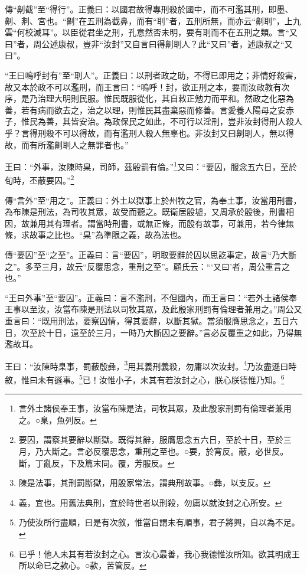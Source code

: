 {\noindent\zhuan{}\fzbyks 傳“劓截”至“得行”。正義曰：以國君故得專刑殺於國中，而不可濫其刑，即墨、劓、剕、宮也。“劓”在五刑為截鼻，而有“刵”者，五刑所無，而亦云“劓刵”，上九雲“何校滅耳”。以臣從君坐之刑，孔意然否未明，要有刵而不在五刑之類。言“又曰”者，周公述康叔，豈非“汝封”又自言曰得劓刵人？此“又曰”者，述康叔之“又曰”。 \par}

{\noindent\shu{}\fzkt “王曰嗚呼封有”至“刵人”。正義曰：以刑者政之助，不得已即用之；非情好殺害，故又本於政不可以濫刑，而王言曰：“嗚呼！封，欲正刑之本，要而汝政教有次序，是乃治理大明則民服。惟民既服從化，其自敕正勉力而平和。然政之化惡為善，若有病而欲去之，治之以理，則惟民其盡棄惡而修善。言愛養人陽母之安赤子，惟民為善，其皆安治。為政保民之如此，不可行以淫刑，豈非汝封得刑人殺人乎？言得刑殺不可以得故，而有濫刑人殺人無辜也。非汝封又曰劓刵人，無以得故，而有所濫劓刵人之無罪者也。” \par}

王曰：“外事，汝陳時臬，司師，茲殷罰有倫。”\footnote{言外土諸侯奉王事，汝當布陳是法，司牧其眾，及此殷家刑罰有倫理者兼用之。○臬，魚列反。}又曰：“要囚，服念五六日，至於旬時，丕蔽要囚。”\footnote{要囚，謂察其要辭以斷獄。既得其辭，服膺思念五六日，至於十日，至於三月，乃大斷之。言必反覆思念，重刑之至也。○要，於宵反。蔽，必世反。斷，丁亂反，下及篇末同。覆，芳服反。}


{\noindent\zhuan{}\fzbyks 傳“言外”至“用之”。正義曰：外土以獄事上於州牧之官，為奉土事，汝當用刑書，為布陳是刑法，為司牧其眾，故受而聽之。既衛居殷墟，又周承於殷後，刑書相因，故兼用其有理者。謂當時刑書，或無正條，而殷有故事，可兼用，若今律無條，求故事之比也。“臬”為準限之義，故為法也。 \par}

{\noindent\zhuan{}\fzbyks 傳“要囚”至“之至”。正義曰：言“要囚”，明取要辭於囚以思訖事定，故言“乃大斷之”。多至三月，故云“反覆思念，重刑之至”。顧氏云：“‘又曰’者，周公重言之也。” \par}

{\noindent\shu{}\fzkt “王曰外事”至“要囚”。正義曰：言不濫刑，不但國內，而王言曰：“若外土諸侯奉王事以至汝，汝當布陳是刑法以司牧其眾，及此殷家刑罰有倫理者兼用之。”周公又重言曰：“既用刑法，要察囚情，得其要辭，以斷其獄。當須服膺思念之，五日六日，次至於十日，遠至於三月，一時乃大斷囚之要辭。”言必反覆重之如此，乃得無濫故耳。 \par}

王曰：“汝陳時臬事，罰蔽殷彝，\footnote{陳是法事，其刑罰斷獄，用殷家常法，謂典刑故事。○彝，以支反。}用其義刑義殺，勿庸以次汝封。\footnote{義，宜也。用舊法典刑，宜於時世者以刑殺，勿庸以就汝封之心所安。}乃汝盡遜曰時敘，惟曰未有遜事。\footnote{乃使汝所行盡順，曰是有次敘，惟當自謂未有順事，君子將興，自以為不足。}已！汝惟小子，未其有若汝封之心，朕心朕德惟乃知。\footnote{已乎！他人未其有若汝封之心。言汝心最善，我心我德惟汝所知。欲其明成王所以命已之款心。○款，苦管反。}


